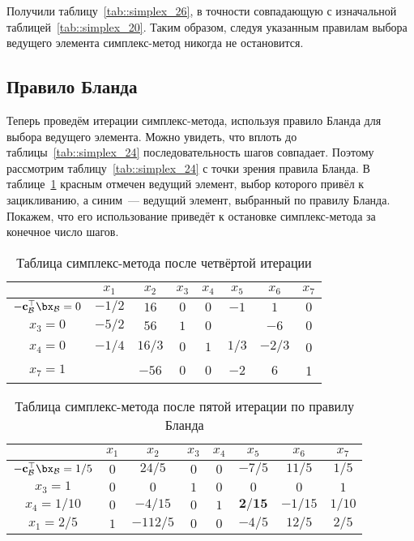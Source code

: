 \documentclass[12pt]{article}
\begin{document}
Получили таблицу~\ref{tab::simplex_26}, в точности совпадающую с изначальной таблицей~\ref{tab::simplex_20}. 
Таким образом, следуя указанным правилам выбора ведущего элемента симплекс-метод никогда не остановится.

\subsection{Правило Бланда}

Теперь проведём итерации симплекс-метода, используя правило Бланда для выбора ведущего элемента.
Можно увидеть, что вплоть до таблицы~\ref{tab::simplex_24} последовательность шагов совпадает.
Поэтому рассмотрим таблицу~\ref{tab::simplex_24} с точки зрения правила Бланда.
В таблице~\ref{tab::simplex_24_2} красным отмечен ведущий элемент, выбор которого привёл к зацикливанию, а синим~--- ведущий элемент, выбранный по правилу Бланда.
Покажем, что его использование приведёт к остановке симплекс-метода за конечное число шагов.

\begin{table}[!ht]
\centering
\caption{Таблица симплекс-метода после четвёртой итерации}
\begin{tabular}{|c|ccccccc|}
\hline
& $x_1$ & $x_2$ & $x_3$ & $x_4$ & $x_5$ & $x_6$ & $x_7$\\
\hline
$-\mathbf{c}_{\mathcal{B}}^{\top}\bx_{\mathcal{B}} = 0$ & $-1/2$ & $16$ & $0$ & $0$ & $-1$ & $1$ & $0$ \\
\hline
$x_3 = 0$ & $-5/2$ & $56$ & $1$ & $0$ & {\color{red}{$\mathbf{2}$}} & $-6$ & $0$ \\
$x_4 = 0$ & $-1/4$ & $16/3$ & $0$ & $1$ & $1/3$ & $-2/3$ & 0 \\
$x_7 = 1$ & {\color{blue}{$\mathbf{5/2}$}} & $-56$ & $0$ & $0$ & $-2$ & $6$ & 1 \\
\hline
\end{tabular}
\label{tab::simplex_24_2}
\end{table}

\begin{table}[!ht]
\centering
\caption{Таблица симплекс-метода после пятой итерации по правилу Бланда}
\begin{tabular}{|c|ccccccc|}
\hline
& $x_1$ & $x_2$ & $x_3$ & $x_4$ & $x_5$ & $x_6$ & $x_7$\\
\hline
$-\mathbf{c}_{\mathcal{B}}^{\top}\bx_{\mathcal{B}} = 1/5$ & $0$ & $24/5$ & $0$ & $0$ & $-7/5$ & $11/5$ & $1/5$ \\
\hline
$x_3 = 1$ & $0$ & $0$ & $1$ & $0$ & $0$ & $0$ & $1$ \\
$x_4 = 1/10$ & $0$ & $-4/15$ & $0$ & $1$ & $\mathbf{2/15}$ & $-1/15$ & $1/10$ \\
$x_1 = 2/5$ & $1$ & $-112/5$ & $0$ & $0$ & $-4/5$ & $12/5$ & $2/5$ \\
\hline
\end{tabular}
\label{tab::simplex_25_2}
\end{table}
\end{document}
